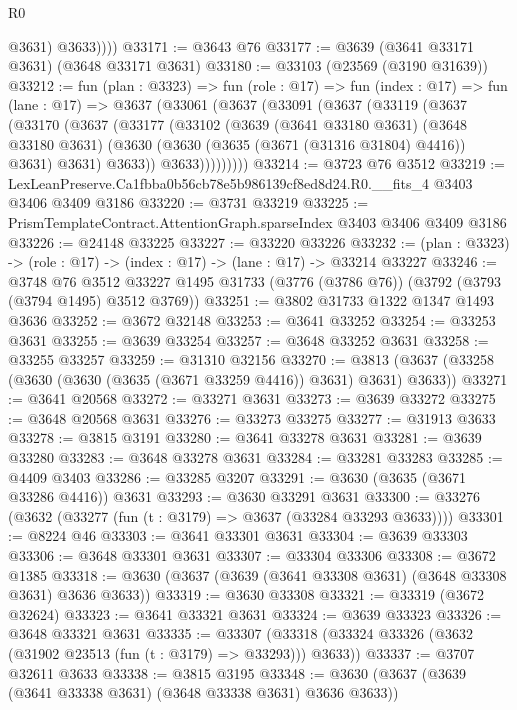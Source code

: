 \begin{lexlean}{R0}
\begin{coremodule}
              @3631)
            @3633))))
@33171 := @3643 @76
@33177 := @3639 (@3641 @33171 @3631) (@3648 @33171 @3631)
@33180 := @33103 (@23569 (@3190 @31639))
@33212 := fun (plan : @3323) =>
  fun (role : @17) =>
  fun (index : @17) =>
  fun (lane : @17) =>
  @3637
    (@33061
      (@3637
        (@33091
          (@3637
            (@33119
              (@3637
                (@33170
                  (@3637
                    (@33177
                      (@33102
                        (@3639
                          (@3641 @33180 @3631)
                          (@3648 @33180 @3631)
                          (@3630 (@3630 (@3635 (@3671 (@31316 @31804) @4416)) @3631) @3631)
                          @3633))
                      @3633)))))))))
@33214 := @3723 @76 @3512
@33219 := LexLeanPreserve.Ca1fbba0b56cb78e5b986139cf8ed8d24.R0.__fits_4 @3403 @3406 @3409 @3186
@33220 := @3731 @33219
@33225 := PrismTemplateContract.AttentionGraph.sparseIndex @3403 @3406 @3409 @3186
@33226 := @24148 @33225
@33227 := @33220 @33226
@33232 := (plan : @3323) -> (role : @17) -> (index : @17) -> (lane : @17) -> @33214 @33227
@33246 := @3748
    @76
    @3512
    @33227
    @1495
    @31733
    (@3776 (@3786 @76))
    (@3792 (@3793 (@3794 @1495) @3512 @3769))
@33251 := @3802 @31733 @1322 @1347 @1493 @3636
@33252 := @3672 @32148
@33253 := @3641 @33252
@33254 := @33253 @3631
@33255 := @3639 @33254
@33257 := @3648 @33252 @3631
@33258 := @33255 @33257
@33259 := @31310 @32156
@33270 := @3813 (@3637 (@33258 (@3630 (@3630 (@3635 (@3671 @33259 @4416)) @3631) @3631) @3633))
@33271 := @3641 @20568
@33272 := @33271 @3631
@33273 := @3639 @33272
@33275 := @3648 @20568 @3631
@33276 := @33273 @33275
@33277 := @31913 @3633
@33278 := @3815 @3191
@33280 := @3641 @33278 @3631
@33281 := @3639 @33280
@33283 := @3648 @33278 @3631
@33284 := @33281 @33283
@33285 := @4409 @3403
@33286 := @33285 @3207
@33291 := @3630 (@3635 (@3671 @33286 @4416)) @3631
@33293 := @3630 @33291 @3631
@33300 := @33276 (@3632 (@33277 (fun (t : @3179) => @3637 (@33284 @33293 @3633))))
@33301 := @8224 @46
@33303 := @3641 @33301 @3631
@33304 := @3639 @33303
@33306 := @3648 @33301 @3631
@33307 := @33304 @33306
@33308 := @3672 @1385
@33318 := @3630 (@3637 (@3639 (@3641 @33308 @3631) (@3648 @33308 @3631) @3636 @3633))
@33319 := @3630 @33308
@33321 := @33319 (@3672 @32624)
@33323 := @3641 @33321 @3631
@33324 := @3639 @33323
@33326 := @3648 @33321 @3631
@33335 := @33307 (@33318 (@33324 @33326 (@3632 (@31902 @23513 (fun (t : @3179) => @33293))) @3633))
@33337 := @3707 @32611 @3633
@33338 := @3815 @3195
@33348 := @3630 (@3637 (@3639 (@3641 @33338 @3631) (@3648 @33338 @3631) @3636 @3633))

\end{coremodule}
\end{lexlean}
